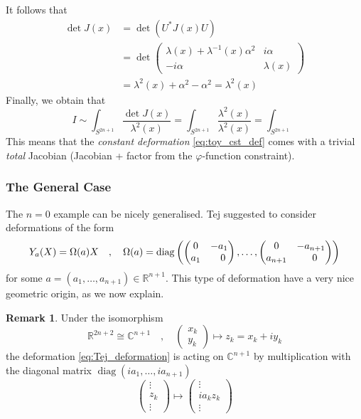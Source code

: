 \documentclass[a4paper,11pt]{article}
\theoremstyle{definition}
\newtheorem{remark}{Remark}
\newcommand{\RR}{\mathbb{R}}
\newcommand{\CC}{\mathbb{C}}
\DeclareMathOperator{\diag}{diag}
\newcommand{\mat}[4]{\begin{pmatrix} #1 & #2 \\ #3 & #4 \end{pmatrix}}
\newcommand{\vek}[2]{\begin{pmatrix} #1 \\ #2 \end{pmatrix}}
\begin{document}
It follows that 
\begin{equation}
  \begin{split} 
    \det J(x) &= \det( U^* J(x) U) \\
    &= \det \mat{\lambda(x) + \lambda^{-1}(x) \alpha^2}{i\alpha}{-i\alpha}{\lambda(x)} \\
    &= \lambda^2(x) + \alpha^2 - \alpha^2 = \lambda^2(x)
  \end{split}
\end{equation}
Finally, we obtain that
\begin{equation}
  I \sim \int_{S^{2n+1}} \frac{\det J(x)}{\lambda^2(x)} = \int_{S^{2n+1}} \frac{\lambda^2(x)}{\lambda^2(x)} = \int_{S^{2n+1}}
\end{equation}
This means that the \emph{constant deformation} \eqref{eq:toy_cst_def} comes with a trivial \emph{total} Jacobian (Jacobian + factor from the $\varphi$-function constraint).

\subsubsection{The General Case}
The $n=0$ example can be nicely generalised. 
Tej suggested to consider deformations of the form
\begin{equation}
  Y_a(X) = \Omega(a) X \quad , \quad \Omega(a) = \diag\left( \mat{0}{-a_1}{a_1}{\hphantom{-}0}, \dots, \mat{0}{-a_{n+1}}{a_{n+1}}{\hphantom{-}0} \right)
  \label{eq:Tej_deformation}
\end{equation}
for some $a = (a_1, \dots, a_{n+1}) \in \RR^{n+1}$.
This type of deformation have a very nice geometric origin, as we now explain.
\begin{remark}
  Under the isomorphism 
  \begin{equation}
    \RR^{2n + 2} \cong \CC^{n+1} \quad , \quad \vek{x_k}{y_k} \mapsto z_k = x_k + i y_k
  \end{equation}
  the deformation \eqref{eq:Tej_deformation} is acting on $\CC^{n+1}$ by multiplication with the diagonal matrix $\diag(i a_1, \dots, i a_{n+1})$
    \begin{equation}
      \begin{pmatrix} \vdots \\ z_k \\ \vdots \end{pmatrix} \mapsto \begin{pmatrix} \vdots \\ i a_k z_k \\  \vdots \end{pmatrix} 
    \end{equation}
\end{remark}
\end{document}
